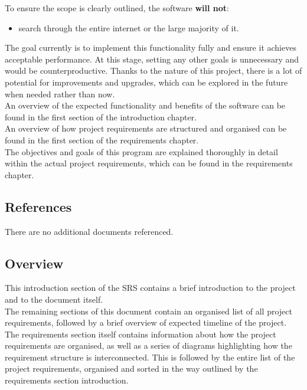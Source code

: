 To ensure the scope is clearly outlined, the software \textbf{will not}:
\begin{itemize}
    \item search through the entire internet or the large majority of it.
\end{itemize}

The goal currently is to implement this functionality fully and ensure it achieves acceptable performance.
At this stage, setting any other goals is unnecessary and would be counterproductive.
Thanks to the nature of this project, there is a lot of potential for improvements and upgrades, which can be explored in the future when needed rather than now. \\

An overview of the expected functionality and benefits of the software can be found in the first section of the introduction chapter. \\

An overview of how project requirements are structured and organised can be found in the first section of the requirements chapter. \\

The objectives and goals of this program are explained thoroughly in detail within the actual project requirements, which can be found in the requirements chapter. \\

\subsection{References}

There are no additional documents referenced.

\subsection{Overview}

This introduction section of the SRS contains a brief introduction to the project \projectname{} and to the document itself. \\

The remaining sections of this document contain an organised list of all project requirements, followed by a brief overview of expected timeline of the project. \\

The requirements section itself contains information about how the project requirements are organised, as well as a series of diagrams highlighting how the requirement structure is interconnected.
This is followed by the entire list of the project requirements, organised and sorted in the way outlined by the requirements section introduction. \\

